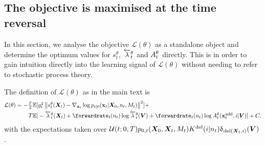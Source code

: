\subsection{The objective is maximised at the time reversal}
\label{sec:tddm-ObjTimeRevProof}

\newcommand{\intxz}{\sum_{n_0=1}^N \int_{\rvx_0 \in \mathbb{R}^{n_0 d}}}

In this section, we analyse the objective $\mathcal{L}(\theta)$ as a standalone object and determine the optimum values for $s_t^\theta$, $\overleftarrow{\lambda}_t^\theta$ and $A_t^\theta$ directly. This is in order to gain intuition directly into the learning signal of $\mathcal{L}(\theta)$ without needing to refer to stochastic process theory.

The definition of $\mathcal{L}(\theta)$ as in the main text is
\begin{align}
    \mathcal{L}(\theta) = \textstyle -\frac{T}{2} \mathbb{E}[&\textstyle  \diffcoeff_t^2 \norm{s_t^\theta(\mX_t) - \nabla_{\rvx_t} \log p_{t|0}(\rvx_t | \mX_0, n_t, M_t)   }^2 ] + \\
    T \mathbb{E} [&\textstyle  - \backwardrate_{t}^\theta(\mX_t) + \forwardrate_t (n_t) \log \backwardrate_{t}^\theta(\mV) + \forwardrate_t(n_t) \log \autonet_{t}^\theta(\xadd_t, i | \mV) ] + C.
\end{align}
with the expectations taken over $\mathcal{U}(t; 0, T) p_{0,t}({\bm{X}}_0, {\bm{X}}_t, M_t) K^{\textup{del}}(i | n_t) \updelta_{\textup{del}({\bm{X}}_t, i)} ({\bm{V}})$.

